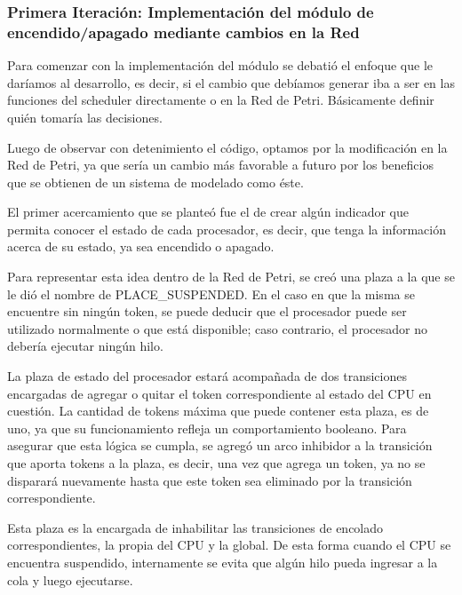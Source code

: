 \subsubsection{Primera Iteración: Implementación del módulo de encendido/apagado mediante cambios en la Red}

Para comenzar con la implementación del módulo se debatió el enfoque que le daríamos al desarrollo, es decir, si el cambio que debíamos generar iba a ser en las funciones del scheduler directamente o en la Red de Petri. Básicamente definir quién tomaría las decisiones.\par

Luego de observar con detenimiento el código, optamos por la modificación en la Red de Petri, ya que sería un cambio más favorable a futuro por los beneficios que se obtienen de un sistema de modelado como éste.\par

El primer acercamiento que se planteó fue el de crear algún indicador que permita conocer el estado de cada procesador, es decir, que tenga la información acerca de su estado, ya sea encendido o apagado.\par

Para representar esta idea dentro de la Red de Petri, se creó una plaza a la que se le dió el nombre de PLACE\_SUSPENDED. En el caso en que la misma se encuentre sin ningún token, se puede deducir que el procesador puede ser utilizado normalmente o que está disponible; caso contrario, el procesador no debería ejecutar ningún hilo.\par

La plaza de estado del procesador estará acompañada de dos transiciones encargadas de agregar o quitar el token correspondiente al estado del CPU en cuestión. La cantidad de tokens máxima que puede contener esta plaza, es de uno, ya que su funcionamiento refleja un comportamiento booleano. Para asegurar que esta lógica se cumpla, se agregó un arco inhibidor a la transición que aporta tokens a la plaza, es decir, una vez que agrega un token, ya no se disparará nuevamente hasta que este token sea eliminado por la transición correspondiente.\par

Esta plaza es la encargada de inhabilitar las transiciones de encolado correspondientes, la propia del CPU y la global. De esta forma cuando el CPU se encuentra suspendido, internamente se evita que algún hilo pueda ingresar a la cola y luego ejecutarse.\par

